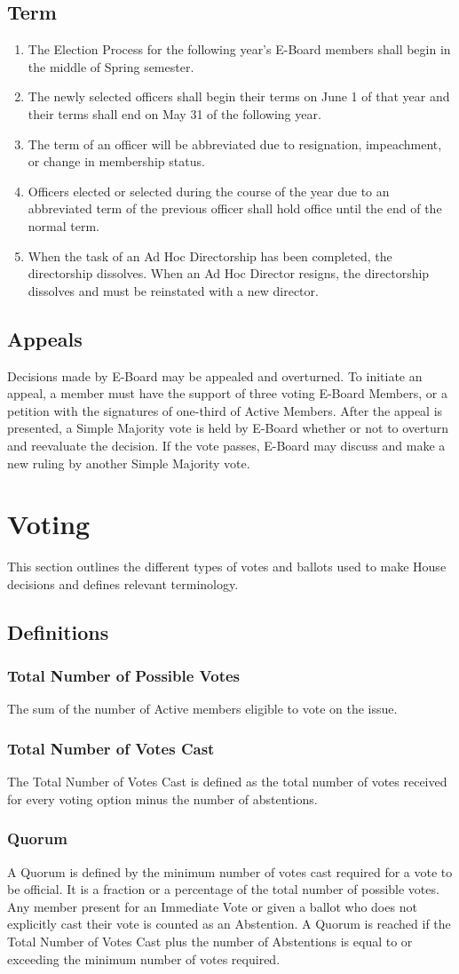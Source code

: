 \documentclass{article}
\newcommand{\article}[1]{\section{#1} \label{#1}}
\newcommand{\asection}[1]{\subsection{#1} \label{#1}}
\newcommand{\asubsection}[1]{\subsubsection{#1} \label{#1}}
\begin{document}
\asection{Term}
\begin{enumerate}
\item The Election Process for the following year's E-Board members shall begin in the middle of Spring semester.
\item The newly selected officers shall begin their terms on June 1 of that year and their terms shall end on May 31 of the following year.
\item The term of an officer will be abbreviated due to resignation, impeachment, or change in membership status.
\item Officers elected or selected during the course of the year due to an abbreviated term of the previous officer shall hold office until the end of the normal term.
\item When the task of an Ad Hoc Directorship has been completed, the directorship dissolves.
	When an Ad Hoc Director resigns, the directorship dissolves and must be reinstated with a new director.
\end{enumerate}

\asection{Appeals}
Decisions made by E-Board may be appealed and overturned.
To initiate an appeal, a member must have the support of three voting E-Board Members, or a petition with the signatures of one-third of Active Members.
After the appeal is presented, a Simple Majority vote is held by E-Board whether or not to overturn and reevaluate the decision.
If the vote passes, E-Board may discuss and make a new ruling by another Simple Majority vote.

\article{Voting}
This section outlines the different types of votes and ballots used to make House decisions and defines relevant terminology.

\asection{Definitions}
\asubsection{Total Number of Possible Votes}
The sum of the number of Active members eligible to vote on the issue.

\asubsection{Total Number of Votes Cast}
The Total Number of Votes Cast is defined as the total number of votes received for every voting option minus the number of abstentions.

\asubsection{Quorum}
A Quorum is defined by the minimum number of votes cast required for a vote to be official.
It is a fraction or a percentage of the total number of possible votes.
Any member present for an Immediate Vote or given a ballot who does not explicitly cast their vote is counted as an Abstention.
A Quorum is reached if the Total Number of Votes Cast plus the number of Abstentions is equal to or exceeding the minimum number of votes required.
\end{document}
